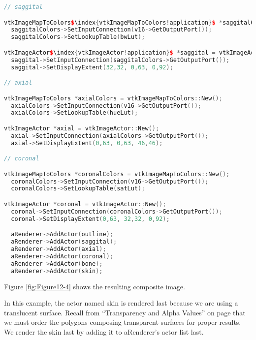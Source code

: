\begin{lstlisting}[language=C++, caption={Mapping the image data and displaying the image slices.}, escapechar=\$]
// saggital

vtkImageMapToColors$\index{vtkImageMapToColors!application}$ *saggitalColors = vtkImageMapToColors::New();
  saggitalColors->SetInputConnection(v16->GetOutputPort());
  saggitalColors->SetLookupTable(bwLut);

vtkImageActor$\index{vtkImageActor!application}$ *saggital = vtkImageActor::New();
  saggital->SetInputConnection(saggitalColors->GetOutputPort());
  saggital->SetDisplayExtent(32,32, 0,63, 0,92);

// axial

vtkImageMapToColors *axialColors = vtkImageMapToColors::New();
  axialColors->SetInputConnection(v16->GetOutputPort());
  axialColors->SetLookupTable(hueLut);

vtkImageActor *axial = vtkImageActor::New();
  axial->SetInputConnection(axialColors->GetOutputPort());
  axial->SetDisplayExtent(0,63, 0,63, 46,46);

// coronal

vtkImageMapToColors *coronalColors = vtkImageMapToColors::New();
  coronalColors->SetInputConnection(v16->GetOutputPort());
  coronalColors->SetLookupTable(satLut);

vtkImageActor *coronal = vtkImageActor::New();
  coronal->SetInputConnection(coronalColors->GetOutputPort());
  coronal->SetDisplayExtent(0,63, 32,32, 0,92);

  aRenderer->AddActor(outline);
  aRenderer->AddActor(saggital);
  aRenderer->AddActor(axial);
  aRenderer->AddActor(coronal);
  aRenderer->AddActor(bone);
  aRenderer->AddActor(skin);
\end{lstlisting}

Figure \ref{fig:Figure12-4} shows the resulting composite image.

In this example, the actor named skin is rendered last because we are using a translucent surface. Recall from ``Transparency and Alpha Values'' on page \pageref{sec:transparency_alpha} that we must order the polygons  composing transparent surfaces for proper results. We render the skin last by adding it to aRenderer's actor list last.

